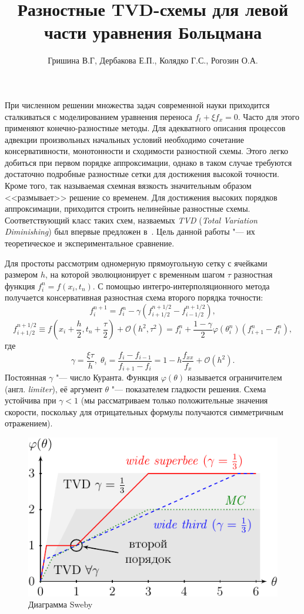\documentclass[a4paper,12pt]{article}
\begin{document}
\title{Разностные TVD-схемы для левой части уравнения Больцмана}
\author{Гришина В.Г, Дербакова Е.П., Колядко Г.С., Рогозин О.А.}
\date{}
\maketitle

При численном решении множества задач современной науки приходится сталкиваться с моделированием уравнения переноса \(f_t+\xi f_x=0 \).
Часто для этого применяют конечно-разностные методы.
Для адекватного описания процессов адвекции произвольных начальных условий необходимо
сочетание консервативности, монотонности и сходимости разностной схемы.
Этого легко добиться при первом порядке аппроксимации,
однако в таком случае требуются достаточно подробные разностные сетки для достижения высокой точности.
Кроме того, так называемая схемная вязкость значительным образом <<размывает>> решение со временем.
Для достижения высоких порядков аппроксимации, приходится строить нелинейные разностные схемы.
Соответствующий класс таких схем, назваемых \textit{TVD} (\textit{Total Variation Diminishing}) был впервые предложен в~\cite{Harten1983}.
Цель данной работы "--- их теоретическое и экспериментальное сравнение.

Для простоты рассмотрим одномерную прямоугольную сетку с ячейками размером \(h\),
на которой эволюционирует с временн\textit{ы}м шагом \(\tau\) разностная функция \(f_i^n = f(x_i,t_n)\).
С помощью интегро-интерполяционного метода~\cite{Samarsky1961} получается консервативная разностная схема второго порядка точности:
\[ f_i^{n+1} = f_i^n - \gamma(f_{i+1/2}^{n+1/2}-f_{i-1/2}^{n+1/2}), \]
\[ f_{i+1/2}^{n+1/2} \equiv f\left(x_i+\frac{h}{2},t_n+\frac{\tau}{2}\right)+\mathcal{O}(h^2,\tau^2)
	= f_i^n + \frac{1-\gamma}{2}\varphi(\theta_i^n)(f_{i+1}^n - f_i^n), \]
где
\[ \gamma=\frac{\xi\tau}{h}, \; \theta_i = \frac{f_i - f_{i-1}}{f_{i+1} - f_i} = 1-h\frac{f_{xx}}{f_x}+\mathcal{O}(h^2).\]
Постоянная \(\gamma\) "--- число Куранта.
Функция \(\varphi(\theta)\) называется ограничителем (англ. \textit{limiter}),
её аргумент \(\theta\) "--- показателем гладкости решения.
Схема устойчива при \(\gamma < 1\) (мы рассматриваем только положительные значения скорости,
поскольку для отрицательных формулы получаются симметричным отражением).

\begin{figure}
	\centering\includegraphics{sweby}
	\caption{Диаграмма Sweby}\label{fig:sweby}
\end{figure}
\end{document}
